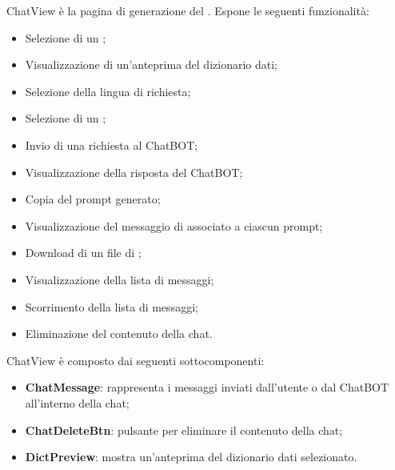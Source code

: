 \par ChatView è la pagina di generazione del . Espone le seguenti funzionalità:
\begin{itemize}
  \item Selezione di un ;
  \item Visualizzazione di un'anteprima del dizionario dati;
  \item Selezione della lingua di richiesta;
  \item Selezione di un ;
  \item Invio di una richiesta al ChatBOT;
  \item Visualizzazione della risposta del ChatBOT;
  \item Copia del prompt generato;
  \item Visualizzazione del messaggio di  associato a ciascun prompt;
  \item Download di un file di ;
  \item Visualizzazione della lista di messaggi;
  \item Scorrimento della lista di messaggi;
  \item Eliminazione del contenuto della chat.
\end{itemize}

\par ChatView è composto dai seguenti sottocomponenti:
\begin{itemize}
  \item \textbf{ChatMessage}: rappresenta i messaggi inviati dall'utente o dal ChatBOT all'interno della chat;
  \item \textbf{ChatDeleteBtn}: pulsante per eliminare il contenuto della chat;
  \item \textbf{DictPreview}: mostra un'anteprima del dizionario dati selezionato.
\end{itemize}

